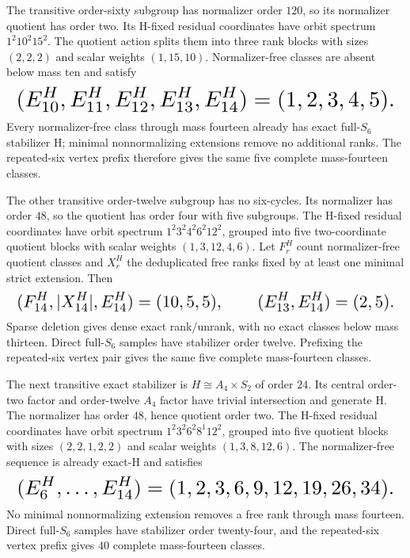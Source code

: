 \documentclass{article}
\newcommand{\fitmath}[1]{\resizebox{0.99\linewidth}{!}{$\displaystyle #1$}}
\begin{document}
The transitive order-sixty subgroup has normalizer order $120$, so its
normalizer quotient has order two. Its H-fixed residual coordinates have orbit
spectrum $1^2 10^2 15^2$. The quotient action splits them into three rank
blocks with sizes $(2,2,2)$ and scalar weights $(1,15,10)$. Normalizer-free
classes are absent below mass ten and satisfy
\begin{equation}
  \fitmath{%
    (E_{10}^H,E_{11}^H,E_{12}^H,E_{13}^H,E_{14}^H)=(1,2,3,4,5).
  }
  \label{eq:optimization-crazy-sextuple-s6-full-transitive-order60-ranking}
\end{equation}
Every normalizer-free class through mass fourteen already has exact full-$S_6$
stabilizer H; minimal nonnormalizing extensions remove no additional ranks.
The repeated-six vertex prefix therefore gives the same five complete
mass-fourteen classes.

The other transitive order-twelve subgroup has no six-cycles. Its normalizer
has order $48$, so the quotient has order four with five subgroups. The H-fixed
residual coordinates have orbit spectrum $1^2 3^2 4^2 6^2 12^2$, grouped into
five two-coordinate quotient blocks with scalar weights $(1,3,12,4,6)$. Let
$F_r^H$ count normalizer-free quotient classes and $X_r^H$ the deduplicated
free ranks fixed by at least one minimal strict extension. Then
\begin{equation}
  \fitmath{%
    (F_{14}^H,|X_{14}^H|,E_{14}^H)=(10,5,5),
    \qquad (E_{13}^H,E_{14}^H)=(2,5).
  }
  \label{eq:optimization-crazy-sextuple-s6-full-transitive-order12-n48-ranking}
\end{equation}
Sparse deletion gives dense exact rank/unrank, with no exact classes below mass
thirteen. Direct full-$S_6$ samples have stabilizer order twelve. Prefixing the
repeated-six vertex pair gives the same five complete mass-fourteen classes.

The next transitive exact stabilizer is $H\cong A_4\times S_2$ of order
$24$. Its central order-two factor and order-twelve $A_4$ factor have trivial
intersection and generate H. The normalizer has order $48$, hence quotient order
two. The H-fixed residual coordinates have orbit spectrum
$1^2 3^2 6^2 8^1 12^2$, grouped into five quotient blocks with sizes
$(2,2,1,2,2)$ and scalar weights $(1,3,8,12,6)$. The normalizer-free sequence is
already exact-H and satisfies
\begin{equation}
  \fitmath{%
    (E_6^H,\ldots,E_{14}^H)=(1,2,3,6,9,12,19,26,34).
  }
  \label{eq:optimization-crazy-sextuple-s6-full-a4-times-s2-ranking}
\end{equation}
No minimal nonnormalizing extension removes a free rank through mass fourteen.
Direct full-$S_6$ samples have stabilizer order twenty-four, and the
repeated-six vertex prefix gives $40$ complete mass-fourteen classes.
\end{document}
